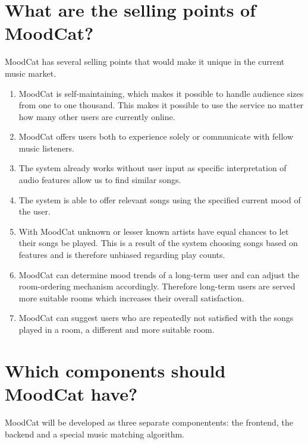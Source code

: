 \documentclass[10pt,a4paper]{article}
\begin{document}
\section{What are the selling points of MoodCat?}
MoodCat has several selling points that would make it unique in the current music market.

\begin{enumerate}
\item MoodCat is self-maintaining, which makes it possible to handle audience sizes from one to one thousand.
This makes it possible to use the service no matter how many other users are currently online.

\item MoodCat offers users both to experience solely or communicate with fellow music listeners.

\item The system already works without user input as specific interpretation of audio features allow us to find similar songs.

\item The system is able to offer relevant songs using the specified current mood of the user.

\item With MoodCat unknown or lesser known artists have equal chances to let their songs be played.
This is a result of the system choosing songs based on features and is therefore unbiased regarding play counts.

\item MoodCat can determine mood trends of a long-term user and can adjust the room-ordering mechanism accordingly.
Therefore long-term users are served more suitable rooms which increases their overall satisfaction.

\item MoodCat can suggest users who are repeatedly not satisfied with the songs played in a room, a different and more suitable room.
\end{enumerate}

\section{Which components should MoodCat have?}
MoodCat will be developed as three separate componentents: the frontend, the backend and a special music matching algorithm.
\end{document}
